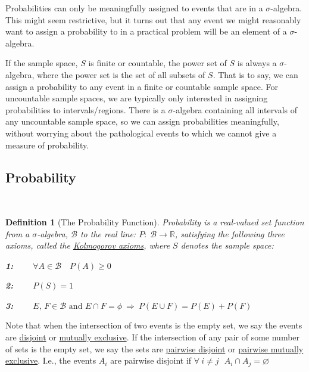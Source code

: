 \documentclass[12pt,a4paper]{article}
\newtheorem{defn}[thm]{Definition}
\begin{document}
Probabilities can only be meaningfully assigned to events that are in a $\sigma$-algebra. This might seem restrictive, but it turns out that any event we might reasonably want to assign a probability to in a practical problem will be an element of a $\sigma$-algebra.

If the sample space, $S$ is finite or countable, the power set of $S$ is always a $\sigma$-algebra, where the power set is the set of all subsets of $S$. That is to say, we can assign a probability to any event in a finite or countable sample space. For uncountable sample spaces, we are typically only interested in assigning probabilities to intervals/regions. There is a $\sigma$-algebra containing all intervals of any uncountable sample space, so we can assign probabilities meaningfully, without worrying about the pathological events to which we cannot give a measure of probability.\par
\vspace{12pt}


\subsection{Probability}$\;$

\begin{defn}[The Probability Function]

Probability is a real-valued set function from a $\sigma$-algebra, $\mathcal{B}$ to the real line: $P:\;\mathcal{B}\rightarrow\mathbb{R}$, satisfying the following three axioms, called the \underline{Kolmogorov axioms}, where $S$ denotes the sample space:\par
\vspace{1pt}
{\bf 1:} $\qquad\forall A\in\mathcal{B}\quad P(A)\geq 0$\par
\vspace{10pt}
{\bf 2:} $\qquad P(S)=1$\par
\vspace{10pt}
{\bf 3:} $\qquad E,\, F\in\mathcal{B}\text{ and }E\cap F=\phi\:\Rightarrow\: P(E\cup F)=P(E)+P(F)$
\end{defn}

Note that when the intersection of two events is the empty set, we say the events are \underline{disjoint} or \underline{mutually exclusive}. If the intersection of any pair of some number of sets is the empty set, we say the sets are \underline{pairwise disjoint} or \underline{pairwise mutually exclusive}. I.e., the events $A_i$ are pairwise disjoint if $\forall \:i\neq j \:\:\:A_i\cap A_j = \varnothing$
\end{document}
